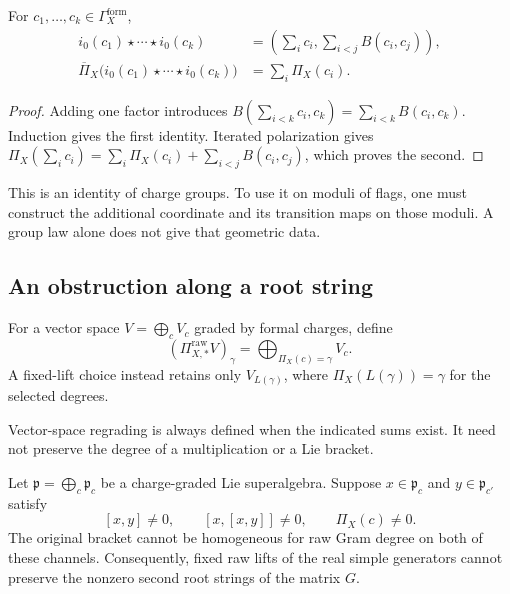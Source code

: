 \begin{lemma}
\label{lem:multiplication-of-raw-placements}
For $c_1,\ldots,c_k\in\Gamma_X^{\mathrm{form}}$,
\[
\begin{aligned}
i_0(c_1)\star\cdots\star i_0(c_k)
&=\left(\sum_i c_i,\sum_{i<j}B(c_i,c_j)\right),\\
\overline\Pi_X\bigl(i_0(c_1)\star\cdots\star i_0(c_k)\bigr)
&=\sum_i\Pi_X(c_i).
\end{aligned}
\]
\end{lemma}

\begin{proof}
Adding one factor introduces
$B(\sum_{i<k}c_i,c_k)=\sum_{i<k}B(c_i,c_k)$.  Induction gives the
first identity.  Iterated polarization gives
$\Pi_X(\sum_i c_i)=\sum_i\Pi_X(c_i)+\sum_{i<j}B(c_i,c_j)$,
which proves the second.
\end{proof}

This is an identity of charge groups.  To use it on moduli of flags,
one must construct the additional coordinate and its transition maps
on those moduli.  A group law alone does not give that geometric data.

\subsection{An obstruction along a root string}
\label{subsec:raw-gram-descent-no-go}

\begin{definition}
\label{def:raw-pi-pushforward}
For a vector space $V=\bigoplus_cV_c$ graded by formal charges, define
\[
(\Pi_{X,*}^{\mathrm{raw}}V)_\gamma
=\bigoplus_{\Pi_X(c)=\gamma}V_c.
\]
A fixed-lift choice instead retains only $V_{L(\gamma)}$, where
$\Pi_X(L(\gamma))=\gamma$ for the selected degrees.
\end{definition}

Vector-space regrading is always defined when the indicated sums
exist.  It need not preserve the degree of a multiplication or a Lie
bracket.

\begin{theorem}
\label{thm:raw-gram-descent-no-go}
Let $\mathfrak p=\bigoplus_c\mathfrak p_c$ be a charge-graded Lie
superalgebra.  Suppose $x\in\mathfrak p_c$ and
$y\in\mathfrak p_{c'}$ satisfy
\[
[x,y]\ne0,\qquad [x,[x,y]]\ne0,\qquad \Pi_X(c)\ne0.
\]
The original bracket cannot be homogeneous for raw Gram degree on
both of these channels.  Consequently, fixed raw lifts of the real
simple generators cannot preserve the nonzero second root strings
of the matrix $G$.
\end{theorem}

